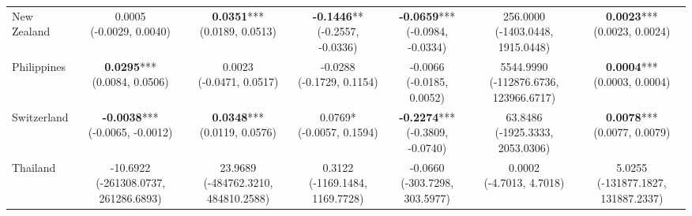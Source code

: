\begin{table}[htbp]
{\begin{tabular}{l|cccccc}
New Zealand          & \makecell{0.0005 \\ \scriptsize{(-0.0029, 0.0040)}} & \makecell{\textbf{0.0351}*** \\ \scriptsize{(0.0189, 0.0513)}} & \makecell{\textbf{-0.1446}** \\ \scriptsize{(-0.2557, -0.0336)}} & \makecell{\textbf{-0.0659}*** \\ \scriptsize{(-0.0984, -0.0334)}} & \makecell{256.0000 \\ \scriptsize{(-1403.0448, 1915.0448)}} & \makecell{\textbf{0.0023}*** \\ \scriptsize{(0.0023, 0.0024)}} \\
Philippines          & \makecell{\textbf{0.0295}*** \\ \scriptsize{(0.0084, 0.0506)}} & \makecell{0.0023 \\ \scriptsize{(-0.0471, 0.0517)}} & \makecell{-0.0288 \\ \scriptsize{(-0.1729, 0.1154)}} & \makecell{-0.0066 \\ \scriptsize{(-0.0185, 0.0052)}} & \makecell{5544.9990 \\ \scriptsize{(-112876.6736, 123966.6717)}} & \makecell{\textbf{0.0004}*** \\ \scriptsize{(0.0003, 0.0004)}} \\
Switzerland          & \makecell{\textbf{-0.0038}*** \\ \scriptsize{(-0.0065, -0.0012)}} & \makecell{\textbf{0.0348}*** \\ \scriptsize{(0.0119, 0.0576)}} & \makecell{0.0769* \\ \scriptsize{(-0.0057, 0.1594)}} & \makecell{\textbf{-0.2274}*** \\ \scriptsize{(-0.3809, -0.0740)}} & \makecell{63.8486 \\ \scriptsize{(-1925.3333, 2053.0306)}} & \makecell{\textbf{0.0078}*** \\ \scriptsize{(0.0077, 0.0079)}} \\
Thailand             & \makecell{-10.6922 \\ \scriptsize{(-261308.0737, 261286.6893)}} & \makecell{23.9689 \\ \scriptsize{(-484762.3210, 484810.2588)}} & \makecell{0.3122 \\ \scriptsize{(-1169.1484, 1169.7728)}} & \makecell{-0.0660 \\ \scriptsize{(-303.7298, 303.5977)}} & \makecell{0.0002 \\ \scriptsize{(-4.7013, 4.7018)}} & \makecell{5.0255 \\ \scriptsize{(-131877.1827, 131887.2337)}} \\

\end{tabular}}
\end{table}
